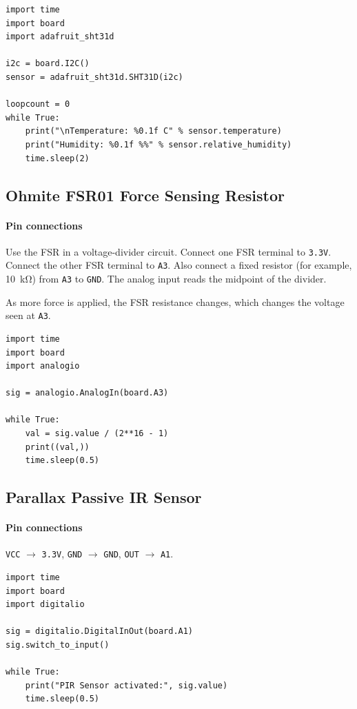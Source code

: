 \documentclass[11pt]{article}
\begin{document}
\begin{lstlisting}
import time
import board
import adafruit_sht31d

i2c = board.I2C()
sensor = adafruit_sht31d.SHT31D(i2c)

loopcount = 0
while True:
    print("\nTemperature: %0.1f C" % sensor.temperature)
    print("Humidity: %0.1f %%" % sensor.relative_humidity)
    time.sleep(2)
\end{lstlisting}

\subsection{Ohmite FSR01 Force Sensing Resistor}
\paragraph{Pin connections} Use the FSR in a voltage-divider circuit. Connect one FSR terminal to \texttt{3.3V}. Connect the other FSR terminal to \texttt{A3}. Also connect a fixed resistor (for example, \SI{10}{\kilo\ohm}) from \texttt{A3} to \texttt{GND}. The analog input reads the midpoint of the divider.

As more force is applied, the FSR resistance changes, which changes the voltage seen at \texttt{A3}.

\begin{lstlisting}
import time
import board
import analogio

sig = analogio.AnalogIn(board.A3)

while True:
    val = sig.value / (2**16 - 1)
    print((val,))
    time.sleep(0.5)
\end{lstlisting}

\subsection{Parallax Passive IR Sensor}
\paragraph{Pin connections} \texttt{VCC} $\rightarrow$ \texttt{3.3V}, \texttt{GND} $\rightarrow$ \texttt{GND}, \texttt{OUT} $\rightarrow$ \texttt{A1}.

\begin{lstlisting}
import time
import board
import digitalio

sig = digitalio.DigitalInOut(board.A1)
sig.switch_to_input()

while True:
    print("PIR Sensor activated:", sig.value)
    time.sleep(0.5)
\end{lstlisting}
\end{document}
